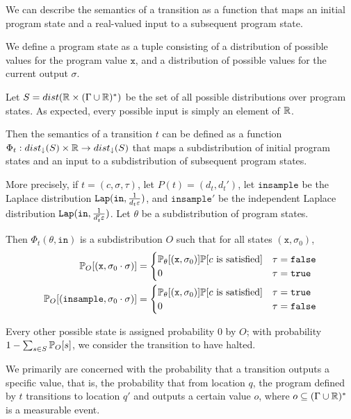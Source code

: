 We can describe the semantics of a transition as a function that maps an initial program state and a real-valued input to a subsequent program state. 

We define a program state as a tuple consisting of a distribution of possible values for the program value $\texttt{x}$, and a distribution of possible values for the current output $\sigma$. 

Let $S = dist(\mathbb{R}\times (\Gamma \cup \mathbb{R})^*)$ be the set of all possible distributions over program states. 
As expected, every possible input is simply an element of $\mathbb{R}$.

Then the semantics of a transition $t$ can be defined as a function $\Phi_t:dist_\downarrow(S)\times \mathbb{R} \to dist_\downarrow (S)$ that maps a subdistribution of initial program states and an input to a subdistribution of subsequent program states. 

More precisely, if $t = (c, \sigma, \tau)$, let $P(t) = (d_t, d_t')$, let $\texttt{insample}$ be the Laplace distribution $\texttt{Lap}(\texttt{in}, \frac{1}{d_t\varepsilon})$, and $\texttt{insample}'$ be the independent Laplace distribution $\texttt{Lap}(\texttt{in}, \frac{1}{d_t'\varepsilon})$. Let $\theta$ be a subdistribution of program states. 

Then $\Phi_t(\theta, \texttt{in})$ is a subdistribution $O$ such that for all states $(\texttt{x}, \sigma_0)$, \begin{align*}
   \mathbb{P}_O[(\texttt{x}, \sigma_0\cdot \sigma)]&= \begin{cases}
    \mathbb{P}_\theta[(\texttt{x}, \sigma_0)]\mathbb{P}[c \text{ is satisfied}]& \tau = \texttt{false}\\
    0 & \tau = \texttt{true}
  \end{cases} \\
  \mathbb{P}_O[(\texttt{insample}, \sigma_0\cdot \sigma)]&= \begin{cases}
    \mathbb{P}_\theta[(\texttt{x}, \sigma_0)]\mathbb{P}[c \text{ is satisfied}]& \tau = \texttt{true}\\
    0 & \tau = \texttt{false}
  \end{cases} 
\end{align*}

Every other possible state is assigned probability 0 by $O$; with probability $1-\sum_{s\in S} \mathbb{P}_O[s]$, we consider the transition to have halted.

We primarily are concerned with the probability that a transition outputs a specific value, that is, the probability that from location $q$, the program defined by $t$ transitions to location $q'$ and outputs a certain value $o$, where $o\subseteq (\Gamma\cup\mathbb{R})^*$ is a measurable event.

